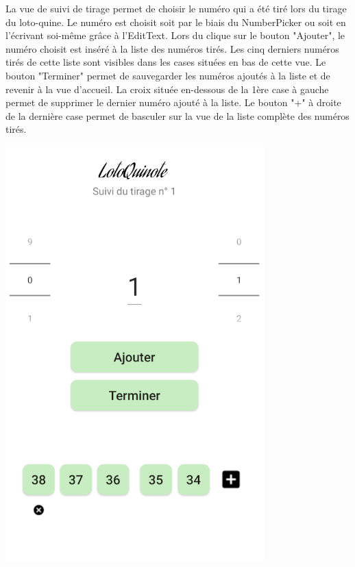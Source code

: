 \documentclass{article}
\begin{document}
    \begin{minipage}{.6\textwidth}%
    La vue de suivi de tirage permet de choisir le numéro qui a été tiré lors du tirage du loto-quine. Le numéro est choisit soit par le biais du NumberPicker ou soit en l'écrivant soi-même grâce à l'EditText.
    \vspace{1em}
    \newline
    Lors du clique sur le bouton "Ajouter", le numéro choisit est inséré à la liste des numéros tirés. Les cinq derniers numéros tirés de cette liste sont visibles dans les cases situées en bas de cette vue.
    \vspace{1em}
    \newline Le bouton "Terminer" permet de sauvegarder les numéros ajoutés à la liste et de revenir à la vue d'accueil.
    \vspace{1em}
    \newline
    La croix située en-dessous de la 1ère case à gauche permet de supprimer le dernier numéro ajouté à la liste.
    \vspace{1em}
    \newline
    Le bouton "+" à droite de la dernière case permet de basculer sur la vue de la liste complète des numéros tirés. 
    \end{minipage}%
    \hfill
    \begin{minipage}{.35\textwidth}%
        \includegraphics[scale=0.7]{suivi.png}
    \end{minipage}%
\end{document}

